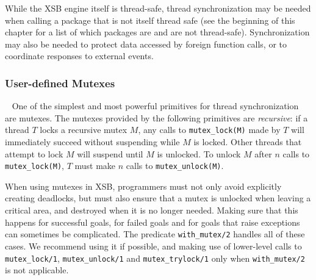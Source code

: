 While the XSB engine itself is thread-safe, thread synchronization may
be needed when calling a package that is not itself thread safe (see
the beginning of this chapter for a list of which packages are and are
not thread-safe).  Synchronization may also be needed to protect data
accessed by foreign function calls, or to coordinate responses to
external events.

\subsubsection{User-defined Mutexes}~\label{sec:mutexes}
%
One of the simplest and most powerful primitives for thread
synchronization are mutexes.  The mutexes provided by the following
primitives are {\em recursive}: if a thread $T$ locks a recursive
mutex $M$, any calls to {\tt mutex\_lock(M)} made by $T$ will
immediately succeed without suspending while $M$ is locked.  Other
threads that attempt to lock $M$ will suspend until $M$ is unlocked.
To unlock $M$ after $n$ calls to {\tt mutex\_lock(M)}, $T$ must make
$n$ calls to {\tt mutex\_unlock(M)}.

When using mutexes in XSB, programmers must not only avoid explicitly
creating deadlocks, but must also ensure that a mutex is unlocked when
leaving a critical area, and destroyed when it is no longer needed.
Making sure that this happens for successful goals, for failed goals
and for goals that raise exceptions can sometimes be complicated.  The
predicate {\tt with\_mutex/2} handles all of these cases.  We
recommend using it if possible, and making use of lower-level calls to
{\tt mutex\_lock/1}, {\tt mutex\_unlock/1} and {\tt mutex\_trylock/1}
only when {\tt with\_mutex/2} is not applicable.

